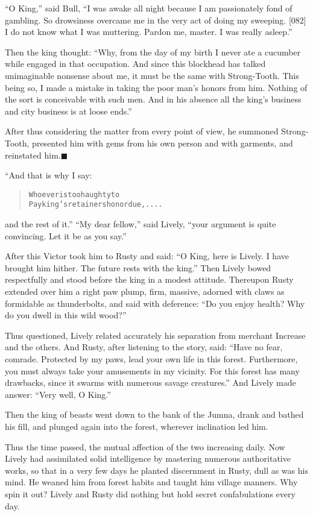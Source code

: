 \documentclass[article, twoside, 14pt]{memoir}
\newcommand{\qed}{\hfill \ensuremath{\blacksquare}}
\renewenvironment{verbatim}{%
\begin{quote}%
\vskip -10pt%
\begin{alltt}\normalfont\large}{\end{alltt}%
\end{quote}%
\vskip -10pt
} %
\begin{document}
``O King,'' said Bull,
``I was awake all night because I am passionately fond of gambling. So drowsiness overcame me in the very act of doing my sweeping. [082] I do not know what I was muttering. Pardon me, master. I was really asleep.''

Then the king thought:
``Why, from the day of my birth I never ate a cucumber while engaged in that occupation. And since this blockhead has talked unimaginable nonsense about me, it must be the same with Strong-Tooth. This being so, I made a mistake in taking the poor man's honors from him. Nothing of the sort is conceivable with such men. And in his absence all the king's business and city business is at loose ends.''

After thus considering the matter from every point of view, he
summoned Strong-Tooth, presented him with gems from his own person
and with garments, and reinstated him.\hyperref[s4]{\qed}

“And that is why I say:

\begin{verbatim}
Whoever is too haughty to
Pay king's retainers honor due, ....
\end{verbatim}
and the rest of it.” ``My dear fellow,'' said Lively,
``your argument is quite convincing. Let it be as you say.''

After this Victor took him to Rusty and said:
``O King, here is Lively. I have brought him hither. The future rests with the king.''
Then Lively bowed respectfully and stood before the king in a
modest attitude. Thereupon Rusty extended over him a right paw
plump, firm, massive, adorned with claws as formidable as
thunderbolts, and said with deference:
``Do you enjoy health? Why do you dwell in this wild wood?''

Thus questioned, Lively related accurately his separation from
merchant Increase and the others. And Rusty, after listening to the
story, said:
``Have no fear, comrade. Protected by my paws, lead your own life in this forest. Furthermore, you must always take your amusements in my vicinity. For this forest has many drawbacks, since it swarms with numerous savage creatures.''
And Lively made answer: ``Very well, O King.''

Then the king of beasts went down to the bank of the Jumna, drank
and bathed his fill, and plunged again into the forest, wherever
inclination led him.

Thus the time passed, the mutual affection of the two increasing
daily. Now Lively had assimilated solid intelligence by mastering
numerous authoritative works, so that in a very few days he planted
discernment in Rusty, dull as was his mind. He weaned him from
forest habits and taught him village manners. Why spin it out?
Lively and Rusty did nothing but hold secret confabulations every
day.
\end{document}
